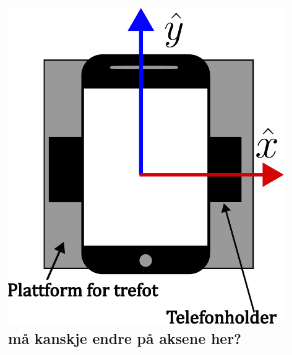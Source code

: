 \begin{figure}
    \centering
    \includegraphics[width=0.65\textwidth]{img/Plattform med telefoni.pdf}
    \caption{\textbf{må kanskje endre på aksene her?} 
        }
    \label{fig:telf_akser}
\end{figure}